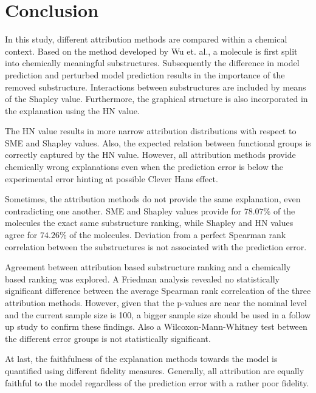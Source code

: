 \chapter{Conclusion}


In this study, different attribution methods are compared within a chemical context. 
Based on the method developed by Wu et. al., a molecule is first split into chemically 
meaningful substructures. Subsequently the difference in model prediction and perturbed 
model prediction results in the importance of the removed substructure. Interactions between 
substructures are included by means of the Shapley value. Furthermore, the graphical structure 
is also incorporated in the explanation using the HN value. 


The HN value results in more narrow attribution distributions with respect to SME and Shapley values.
Also, the expected relation between functional groups is correctly captured by the HN value. However, 
all attribution methods provide chemically wrong explanations even when the prediction error is below 
the experimental error hinting at possible Clever Hans effect. 


Sometimes, the attribution methods do not provide the same explanation, even contradicting one another. 
SME and Shapley values provide for $78.07\%$ of the molecules the exact same substructure ranking, while 
Shapley and HN values agree for $74.26\%$ of the molecules. Deviation from a perfect Spearman rank correlation 
between the substructures is not associated with the prediction error. 


Agreement between attribution based substructure ranking and a chemically based ranking was explored.
A Friedman analysis revealed no statistically significant difference between the average Spearman 
rank correlcation of the three attribution methods. However, given that the p-values are near the 
nominal level and the current sample size is 100, a bigger sample size should be used in a follow up 
study to confirm these findings. Also a Wilcoxon-Mann-Whitney test between the different 
error groups is not statistically significant.


At last, the faithfulness of the explanation methods towards the model is quantified using different 
fidelity measures. Generally, all attribution are equally faithful to the model regardless of the prediction 
error with a rather poor fidelity.
